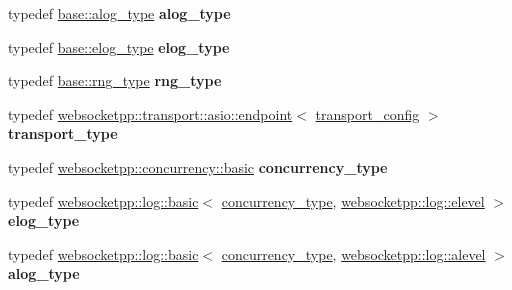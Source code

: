 \begin{DoxyCompactItemize}
\item 
typedef \hyperlink{classwebsocketpp_1_1log_1_1basic}{base\+::alog\+\_\+type} {\bfseries alog\+\_\+type}\hypertarget{classconfig_a8f3aa3e7ec232dcb93817fc853cfc004}{}\label{classconfig_a8f3aa3e7ec232dcb93817fc853cfc004}

\item 
typedef \hyperlink{classwebsocketpp_1_1log_1_1basic}{base\+::elog\+\_\+type} {\bfseries elog\+\_\+type}\hypertarget{classconfig_afb2e5eb6e70ba3b59818243be1057b05}{}\label{classconfig_afb2e5eb6e70ba3b59818243be1057b05}

\item 
typedef \hyperlink{classwebsocketpp_1_1random_1_1none_1_1int__generator}{base\+::rng\+\_\+type} {\bfseries rng\+\_\+type}\hypertarget{classconfig_a51e474b4b9e1948b0f304c482b2474b5}{}\label{classconfig_a51e474b4b9e1948b0f304c482b2474b5}

\item 
typedef \hyperlink{classwebsocketpp_1_1transport_1_1asio_1_1endpoint}{websocketpp\+::transport\+::asio\+::endpoint}$<$ \hyperlink{structconfig_1_1transport__config}{transport\+\_\+config} $>$ {\bfseries transport\+\_\+type}\hypertarget{classconfig_afac55cb30b371d2299b5d6767d89325f}{}\label{classconfig_afac55cb30b371d2299b5d6767d89325f}

\item 
typedef \hyperlink{classwebsocketpp_1_1concurrency_1_1basic}{websocketpp\+::concurrency\+::basic} {\bfseries concurrency\+\_\+type}\hypertarget{classconfig_ac0887fd1fa6dd32b541f9a1705a09387}{}\label{classconfig_ac0887fd1fa6dd32b541f9a1705a09387}

\item 
typedef \hyperlink{classwebsocketpp_1_1log_1_1basic}{websocketpp\+::log\+::basic}$<$ \hyperlink{classwebsocketpp_1_1concurrency_1_1none}{concurrency\+\_\+type}, \hyperlink{structwebsocketpp_1_1log_1_1elevel}{websocketpp\+::log\+::elevel} $>$ {\bfseries elog\+\_\+type}\hypertarget{classconfig_a298a582b7f4f06af3bcd91c1a285c693}{}\label{classconfig_a298a582b7f4f06af3bcd91c1a285c693}

\item 
typedef \hyperlink{classwebsocketpp_1_1log_1_1basic}{websocketpp\+::log\+::basic}$<$ \hyperlink{classwebsocketpp_1_1concurrency_1_1none}{concurrency\+\_\+type}, \hyperlink{structwebsocketpp_1_1log_1_1alevel}{websocketpp\+::log\+::alevel} $>$ {\bfseries alog\+\_\+type}\hypertarget{classconfig_af3175c9be7ea9f799463680577ed3f9f}{}\label{classconfig_af3175c9be7ea9f799463680577ed3f9f}

\end{DoxyCompactItemize}
